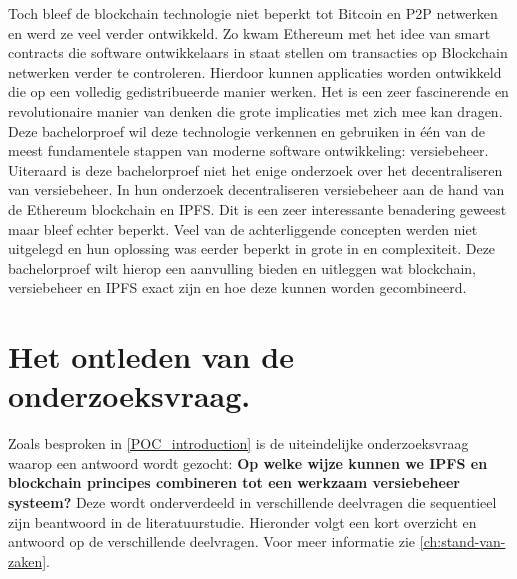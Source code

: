Toch bleef de blockchain technologie niet beperkt tot Bitcoin en P2P netwerken en werd ze veel verder ontwikkeld. Zo kwam Ethereum met het idee van smart contracts die software ontwikkelaars in staat stellen om transacties op Blockchain netwerken verder te controleren. Hierdoor kunnen applicaties worden ontwikkeld die op een volledig gedistribueerde manier werken. Het is een zeer fascinerende en revolutionaire manier van denken die grote implicaties met zich mee kan dragen.\\

Deze bachelorproef wil deze technologie verkennen en gebruiken in één van de meest fundamentele stappen van moderne software ontwikkeling: versiebeheer.\\

Uiteraard is deze bachelorproef niet het enige onderzoek over het decentraliseren van versiebeheer. In hun onderzoek decentraliseren \textcite{Nizamuddin2019} versiebeheer aan de hand van de Ethereum blockchain en IPFS. Dit is een zeer interessante benadering geweest maar bleef echter beperkt. Veel van de achterliggende concepten werden niet uitgelegd en hun oplossing was eerder beperkt in grote in en complexiteit. Deze bachelorproef wilt hierop een aanvulling bieden en uitleggen wat blockchain, versiebeheer en IPFS exact zijn en hoe deze kunnen worden gecombineerd.

\section{Het ontleden van de onderzoeksvraag.}
Zoals besproken in \ref{POC_introduction} is de uiteindelijke onderzoeksvraag waarop een antwoord wordt gezocht: \textbf{Op welke wijze kunnen we IPFS en blockchain principes combineren tot een werkzaam versiebeheer systeem?} Deze wordt onderverdeeld in verschillende deelvragen die sequentieel zijn beantwoord in de literatuurstudie. Hieronder volgt een kort overzicht en antwoord op de verschillende deelvragen. Voor meer informatie zie \ref{ch:stand-van-zaken}.
 
